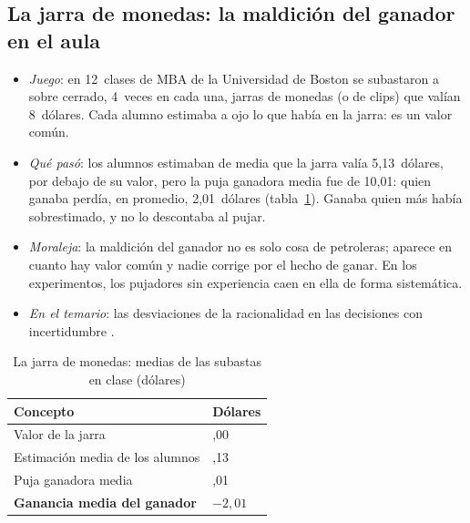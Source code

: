 \documentclass[11pt]{article}
\begin{document}
\subsection*{La jarra de monedas: la maldición del ganador en el aula}

\begin{itemize}
\item \emph{Juego}\nocite{BazermanSamuelson1983Won}: en 12~clases de MBA de la Universidad de Boston se subastaron a sobre cerrado, 4~veces en cada una, jarras de monedas (o de clips) que valían 8~dólares. Cada alumno estimaba a ojo lo que había en la jarra: es un valor común.
\item \emph{Qué pasó}: los alumnos estimaban de media que la jarra valía 5,13~dólares, por debajo de su valor, pero la puja ganadora media fue de 10,01: quien ganaba perdía, en promedio, 2,01~dólares\nocite{Thaler1988Anomalies} (tabla~\ref{tab:jarra}). Ganaba quien más había sobrestimado, y no lo descontaba al pujar.
\item \emph{Moraleja}: la maldición del ganador no es solo cosa de petroleras; aparece en cuanto hay valor común y nadie corrige por el hecho de ganar. En los experimentos, los pujadores sin experiencia caen en ella de forma sistemática\nocite{KagelLevin1986Winners}.
\item \emph{En el temario}: las desviaciones de la racionalidad en las decisiones con incertidumbre .
\end{itemize}

\begin{table}[H]
\centering
\caption{La jarra de monedas: medias de las subastas en clase (dólares)}\label{tab:jarra}
\begin{tabular}{>{\raggedright\arraybackslash}m{6.4cm}>{\centering\arraybackslash}m{2.4cm}}
\toprule
\rowcolor{tceeazulpalido}\textbf{Concepto} & \textbf{Dólares}\\
\midrule
Valor de la jarra & 8,00\\
Estimación media de los alumnos & 5,13\\
Puja ganadora media & 10,01\\
\addlinespace[0.3em]
\cellcolor{tceesalvia}\textbf{Ganancia media del ganador} & \cellcolor{tceesalvia}$-2{,}01$\\
\bottomrule
\end{tabular}
\end{table}
\end{document}
